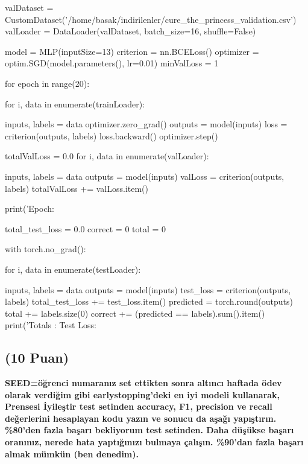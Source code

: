 \documentclass[11pt]{article}
\begin{document}
\begin{python}
valDataset = CustomDataset('/home/basak/indirilenler/cure_the_princess_validation.csv')
valLoader = DataLoader(valDataset, batch_size=16, shuffle=False)

model = MLP(inputSize=13)
criterion = nn.BCELoss()
optimizer = optim.SGD(model.parameters(), lr=0.01)
minValLoss = 1

for epoch in range(20):

    for i, data in enumerate(trainLoader):

        inputs, labels = data
        optimizer.zero_grad()
        outputs = model(inputs)
        loss = criterion(outputs, labels)
        loss.backward()
        optimizer.step()

    totalValLoss = 0.0
    for i, data in enumerate(valLoader):

        inputs, labels = data
        outputs = model(inputs)
        valLoss = criterion(outputs, labels)
        totalValLoss += valLoss.item()

    print('Epoch: %

total_test_loss = 0.0
correct = 0
total = 0

with torch.no_grad():

    for i, data in enumerate(testLoader):

        inputs, labels = data
        outputs = model(inputs)
        test_loss = criterion(outputs, labels)
        total_test_loss += test_loss.item()
        predicted = torch.round(outputs)
        total += labels.size(0)
        correct += (predicted == labels).sum().item()
print('Totals : Test Loss: %

\end{python}

\begin{comment}
\begin{figure}[ht!]
    \centering
    \texttt{[image: mypicturehere.png]}
    \caption{Buraya açıklama yazın}
    \label{fig:my_pic}
\end{figure}
\end{comment}

\subsection{(10 Puan)} \textbf{SEED=öğrenci numaranız set ettikten sonra altıncı haftada ödev olarak verdiğim gibi earlystopping'deki en iyi modeli kullanarak, Prensesi İyileştir test setinden accuracy, F1, precision ve recall değerlerini hesaplayan kodu yazın ve sonucu da aşağı yapıştırın. \%80'den fazla başarı bekliyorum test setinden. Daha düşükse başarı oranınız, nerede hata yaptığınızı bulmaya çalışın. \%90'dan fazla başarı almak mümkün (ben denedim).}
\end{document}
